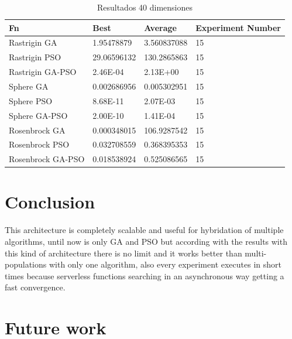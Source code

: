 \documentclass[runningheads]{llncs}
\begin{document}
            \begin{table}[htp]
              \caption{Resultados 40 dimensiones}
              \label{table:resultados-2}
              \centering
              \begin{tabular}{|l|l|l|l|}
              \hline
              Fn & Best & Average & Experiment Number \\
              \hline
              \hline
              Rastrigin GA & 1.95478879 & 3.560837088 & 15\\
              \hline
              Rastrigin PSO & 29.06596132 & 130.2865863 & 15\\
              \hline
              Rastrigin GA-PSO & 2.46E-04 & 2.13E+00 & 15\\
              \hline
              Sphere GA & 0.002686956 & 0.005302951 & 15\\
              \hline
              Sphere PSO & 8.68E-11 & 2.07E-03 & 15\\
              \hline
              Sphere GA-PSO & 2.00E-10 & 1.41E-04 & 15\\
              \hline
              Rosenbrock GA & 0.000348015 & 106.9287542 & 15\\
              \hline
              Rosenbrock PSO & 0.032708559 & 0.368395353 & 15\\
              \hline
              Rosenbrock GA-PSO & 0.018538924 & 0.525086565 & 15\\
              \hline
              \end{tabular}
              \end{table}
%
%
% 
% 
%
\section{Conclusion}

This architecture is completely scalable and useful for hybridation of multiple algorithms,
until now is only GA and PSO but according with the results with this kind of architecture
there is no limit and it works better than multi-populations with only one algorithm, also
every experiment executes in short times because serverless functions searching in an asynchronous way getting a fast convergence.

\section{Future work}
\end{document}
